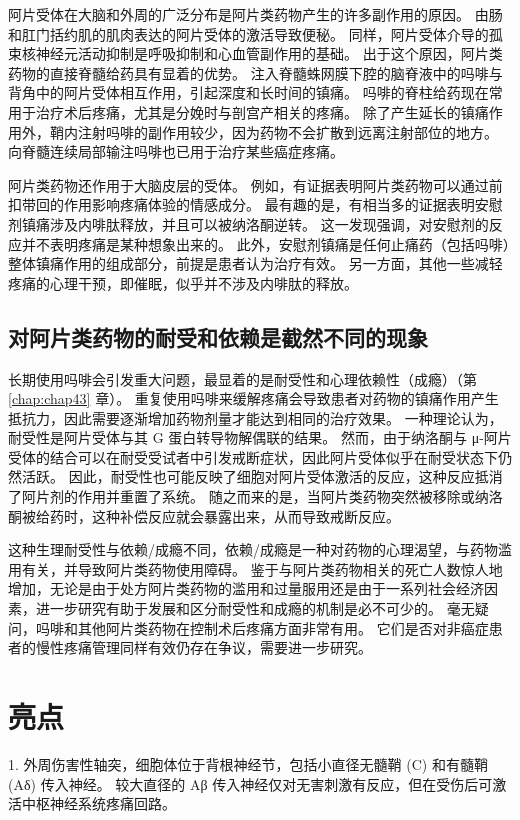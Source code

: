 阿片受体在大脑和外周的广泛分布是阿片类药物产生的许多副作用的原因。 
由肠和肛门括约肌的肌肉表达的阿片受体的激活导致便秘。 
同样，阿片受体介导的孤束核神经元活动抑制是呼吸抑制和心血管副作用的基础。 
出于这个原因，阿片类药物的直接脊髓给药具有显着的优势。 
注入脊髓蛛网膜下腔的脑脊液中的吗啡与背角中的阿片受体相互作用，引起深度和长时间的镇痛。 
吗啡的脊柱给药现在常用于治疗术后疼痛，尤其是分娩时与剖宫产相关的疼痛。 
除了产生延长的镇痛作用外，鞘内注射吗啡的副作用较少，因为药物不会扩散到远离注射部位的地方。 
向脊髓连续局部输注吗啡也已用于治疗某些癌症疼痛。


阿片类药物还作用于大脑皮层的受体。 
例如，有证据表明阿片类药物可以通过前扣带回的作用影响疼痛体验的情感成分。 
最有趣的是，有相当多的证据表明安慰剂镇痛涉及内啡肽释放，并且可以被纳洛酮逆转。 
这一发现强调，对安慰剂的反应并不表明疼痛是某种想象出来的。 
此外，安慰剂镇痛是任何止痛药（包括吗啡）整体镇痛作用的组成部分，前提是患者认为治疗有效。 
另一方面，其他一些减轻疼痛的心理干预，即催眠，似乎并不涉及内啡肽的释放。


\subsection{对阿片类药物的耐受和依赖是截然不同的现象}
长期使用吗啡会引发重大问题，最显着的是耐受性和心理依赖性（成瘾）（第 \ref{chap:chap43} 章）。 
重复使用吗啡来缓解疼痛会导致患者对药物的镇痛作用产生抵抗力，因此需要逐渐增加药物剂量才能达到相同的治疗效果。 
一种理论认为，耐受性是阿片受体与其 G 蛋白转导物解偶联的结果。 
然而，由于纳洛酮与 μ-阿片受体的结合可以在耐受受试者中引发戒断症状，因此阿片受体似乎在耐受状态下仍然活跃。 
因此，耐受性也可能反映了细胞对阿片受体激活的反应，这种反应抵消了阿片剂的作用并重置了系统。 
随之而来的是，当阿片类药物突然被移除或纳洛酮被给药时，这种补偿反应就会暴露出来，从而导致戒断反应。


这种生理耐受性与依赖/成瘾不同，依赖/成瘾是一种对药物的心理渴望，与药物滥用有关，并导致阿片类药物使用障碍。 
鉴于与阿片类药物相关的死亡人数惊人地增加，无论是由于处方阿片类药物的滥用和过量服用还是由于一系列社会经济因素，进一步研究有助于发展和区分耐受性和成瘾的机制是必不可少的。 
毫无疑问，吗啡和其他阿片类药物在控制术后疼痛方面非常有用。
它们是否对非癌症患者的慢性疼痛管理同样有效仍存在争议，需要进一步研究。


\section{亮点}

1. 外周伤害性轴突，细胞体位于背根神经节，包括小直径无髓鞘 (C) 和有髓鞘 (Aδ) 传入神经。 
较大直径的 Aβ 传入神经仅对无害刺激有反应，但在受伤后可激活中枢神经系统疼痛回路。 


